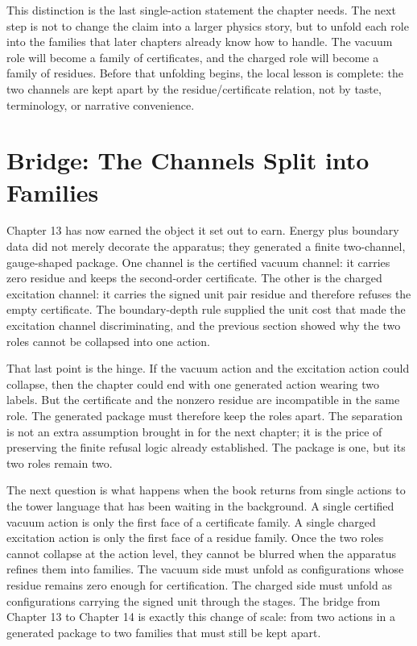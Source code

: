 This distinction is the last single-action statement the chapter needs. The next
step is not to change the claim into a larger physics story, but to unfold each
role into the families that later chapters already know how to handle. The
vacuum role will become a family of certificates, and the charged role will
become a family of residues. Before that unfolding begins, the local lesson is
complete: the two channels are kept apart by the residue/certificate relation,
not by taste, terminology, or narrative convenience.

\section*{Bridge: The Channels Split into Families}

Chapter 13 has now earned the object it set out to earn. Energy plus boundary
data did not merely decorate the apparatus; they generated a finite
two-channel, gauge-shaped package. One channel is the certified vacuum channel:
it carries zero residue and keeps the second-order certificate. The other is
the charged excitation channel: it carries the signed unit pair residue and
therefore refuses the empty certificate. The boundary-depth rule supplied the
unit cost that made the excitation channel discriminating, and the previous
section showed why the two roles cannot be collapsed into one action.

That last point is the hinge. If the vacuum action and the excitation action
could collapse, then the chapter could end with one generated action wearing
two labels. But the certificate and the nonzero residue are incompatible in the
same role. The generated package must therefore keep the roles apart. The
separation is not an extra assumption brought in for the next chapter; it is the
price of preserving the finite refusal logic already established. The package is one,
but its two roles remain two.

The next question is what happens when the book returns from single actions to
the tower language that has been waiting in the background. A single certified
vacuum action is only the first face of a certificate family. A single charged
excitation action is only the first face of a residue family. Once the two roles
cannot collapse at the action level, they cannot be blurred when the apparatus
refines them into families. The vacuum side must unfold as configurations whose
residue remains zero enough for certification. The charged side must unfold as
configurations carrying the signed unit through the stages. The bridge from
Chapter 13 to Chapter 14 is exactly this change of scale: from two actions in a
generated package to two families that must still be kept apart.

